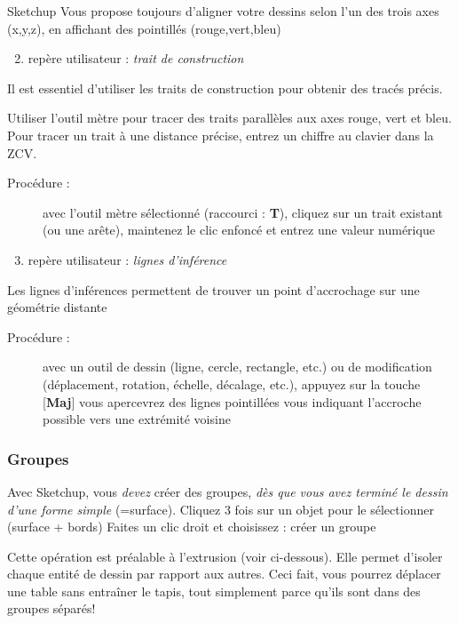 \documentclass[a4paper,12pt,french]{sphinxmanual}
\begin{document}
Sketchup Vous propose toujours d'aligner votre dessins selon l'un des trois axes (x,y,z), en affichant des pointillés (rouge,vert,bleu)
\begin{enumerate}
\setcounter{enumi}{1}
\item {} 
repère utilisateur : \emph{trait de construction}

\end{enumerate}

Il est essentiel d'utiliser les traits de construction pour obtenir des tracés précis.

Utiliser l'outil mètre pour tracer des traits parallèles aux axes rouge, vert et bleu. Pour tracer un trait à une distance précise, entrez un chiffre au clavier dans la ZCV.
\begin{description}
\item[{Procédure :}] \leavevmode
avec l'outil mètre sélectionné (raccourci : \textbf{T}),
cliquez sur un trait existant (ou une arête),
maintenez le clic enfoncé et entrez une valeur numérique

\end{description}
\begin{enumerate}
\setcounter{enumi}{2}
\item {} 
repère utilisateur : \emph{lignes d'inférence}

\end{enumerate}

Les lignes d'inférences permettent de trouver un point d'accrochage sur une géométrie distante
\begin{description}
\item[{Procédure :}] \leavevmode
avec un outil de dessin (ligne, cercle, rectangle, etc.) ou de modification (déplacement, rotation, échelle, décalage, etc.),
appuyez sur la touche {[}\textbf{Maj}{]}
vous apercevrez des lignes pointillées vous indiquant l'accroche possible vers une extrémité voisine

\end{description}


\subsubsection{Groupes}
\label{su/intro-su:groupes}
Avec Sketchup, vous \emph{devez} créer des groupes, \emph{dès que vous avez terminé le dessin d'une forme simple} (=surface).
Cliquez 3 fois sur un objet pour le sélectionner (surface + bords)
Faites un clic droit et choisissez : créer un groupe

Cette opération est préalable à l'extrusion (voir ci-dessous). Elle permet d'isoler chaque entité de dessin par rapport aux autres. Ceci fait, vous pourrez déplacer une table sans entraîner le tapis, tout simplement parce qu'ils sont dans des groupes séparés!
\end{document}
